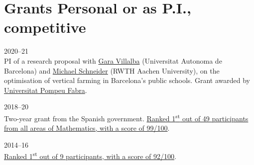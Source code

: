 \section*{Grants {\small Personal or as P.I., competitive}}

\begin{paracol}{2}
  2020--21
\switchcolumn
  \\
  PI of a research proposal with \href{https://ictaweb.uab.cat/personal_detail.php?id=8}{Gara Villalba} (Universitat Autonoma de Barcelona) and \href{https://www.dpo.rwth-aachen.de/cms/DPO/Der-Lehrstuhl/Team/Lehrstuhlleitung/~nwkh/Michael-Schneider/}{Michael Schneider} (RWTH Aachen University), on the optimisation of vertical farming in Barcelona's public schools.
  Grant awarded by \href{https://www.upf.edu/}{Universitat Pompeu Fabra}.
\end{paracol}

\begin{paracol}{2}
  2018--20
\switchcolumn
  \\
  Two-year grant from the Spanish government.
  \href{https://santini.in/files/cv/jdc17.pdf}{Ranked 1\textsuperscript{st} out of 49 participants from all areas of Mathematics, with a score of 99/100}.
\end{paracol}

\begin{paracol}{2}
  2014--16
\switchcolumn
  \\
  \href{https://santini.in/files/cv/phd14.pdf}{Ranked 1\textsuperscript{st} out of 9 participants, with a score of 92/100}.
\end{paracol}